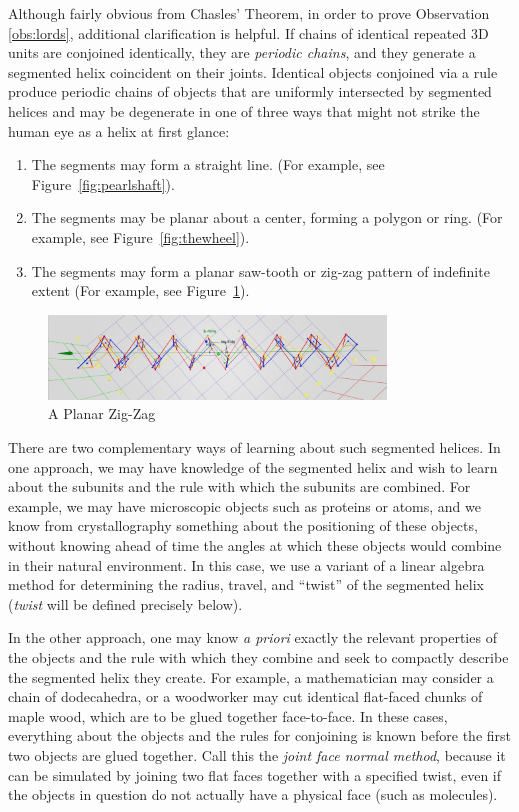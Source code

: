 \documentclass[mathematics,article,submit,pdftex,moreauthors]{Definitions/mdpi}
\begin{document}
Although fairly obvious from Chasles' Theorem, in order to prove Observation \ref{obs:lords},
additional clarification is helpful.
If chains of identical repeated 3D units are conjoined identically, they are {\em periodic chains},
and they generate a segmented helix coincident on their joints.
Identical objects conjoined via a rule
produce periodic chains of objects that are uniformly intersected
by segmented helices and may be degenerate in one of
three ways that might not strike the human eye as a helix at first glance:
\begin{enumerate}
\item The segments may form a straight line. (For example, see Figure~\ref{fig:pearlshaft}).
\item The segments may be planar about a center, forming a polygon or ring. (For example, see Figure~\ref{fig:thewheel}).
\item The segments may form a planar saw-tooth or zig-zag pattern of indefinite extent (For example, see Figure~\ref{fig:planarzigzag}).
\end{enumerate}

\begin{figure}
  \centering
  \captionsetup{justification=centering}
     \includegraphics[width=0.80\textwidth]{figures/PlanarZigZag.png}
     \caption{A Planar Zig-Zag}
  \label{fig:planarzigzag}
\end{figure}
\unskip


There are two complementary ways of learning about such segmented helices.
In one approach, we may have knowledge of the segmented helix and
wish to learn about the subunits and the rule with which the subunits are combined.
For example, we may have microscopic objects such as proteins
or atoms, and we know from crystallography something about the positioning of these objects, without
knowing ahead of time the angles at which these objects would combine in their natural environment.
In this case, we use a variant of a linear algebra method \cite{kahn1989defining}
for determining the radius, travel, and ``twist''
of the segmented helix ({\em twist} will be defined precisely below).

In the other approach, one may know {\it a priori} exactly the
relevant properties of the objects and the rule with which they combine
and seek to compactly describe the segmented helix they create.
For example, a mathematician may consider a chain of dodecahedra,
or a woodworker may cut identical flat-faced chunks of maple wood,
which are to be glued together face-to-face.
In these cases, everything about the objects and the rules for conjoining
is known before the first two objects are glued together.
Call this the {\em joint face normal method}, because
it can be simulated by joining two flat faces together with a specified twist,
even if the objects in question
do not actually have a physical face (such as molecules).
\end{document}
